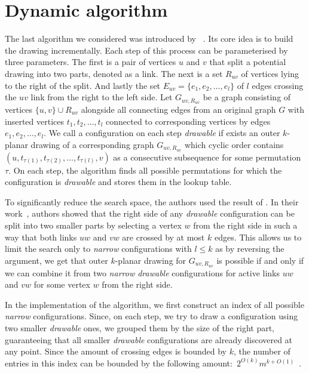 
\section{Dynamic algorithm}

The last algorithm we considered was introduced by \citeauthor{okp}~\cite{okp}. Its core idea is to build the drawing incrementally. Each step of this process can be parameterised by three parameters. The first is a pair of vertices \(u\) and \(v\) that split a potential drawing into two parts, denoted as a link. The next is a set \(R_{uv}\) of vertices lying to the right of the split. And lastly the set \(E_{uv} = \{e_1, e_2, \dots, e_l\}\) of \(l\) edges crossing the \(uv\) link from the right to the left side. Let \(G_{uv, R_{uv}}\) be a graph consisting of vertices \(\{u, v\} \cup R_{uv}\) alongside all connecting edges  from an original graph \(G\) with inserted vertices \(t_1, t_2, \dots, t_l\) connected to corresponding vertices by edges \(e_1, e_2, \dots, e_l\). We call a configuration on each step \emph{drawable} if exists an outer \(k\)-planar drawing of a corresponding graph \(G_{uv, R_{uv}}\) which cyclic order contains \((u, t_{\tau(1)}, t_{\tau(2)}, \dots, t_{\tau(l)}, v)\) as a consecutive subsequence for some permutation \(\tau\). On each step, the algorithm finds all possible permutations for which the configuration is \emph{drawable} and stores them in the lookup table.

To significantly reduce the search space, the authors used the result of \citeauthor{triangulations}. In their work~\cite{triangulations}, authors showed that the right side of any \emph{drawable} configuration can be split into two smaller parts by selecting a vertex \(w\) from the right side in such a way that both links \(uw\) and \(vw\) are crossed by at most \(k\) edges. This allows us to limit the search only to \emph{narrow} configurations with \(l \leqslant k\) as by reversing the argument, we get that outer \(k\)-planar drawing for \(G_{uv, R_{uv}}\) is possible if and only if we can combine it from two \emph{narrow drawable} configurations for active links \(uw\) and \(vw\) for some vertex \(w\) from the right side.

In the implementation of the algorithm, we first construct an index of all possible \emph{narrow} configurations. Since, on each step, we try to draw a configuration using two smaller \emph{drawable} ones, we grouped them by the size of the right part, guaranteeing that all smaller \emph{drawable} configurations are already discovered at any point. Since the amount of crossing edges is bounded by \(k\), the number of entries in this index can be bounded by the following amount:~\(2^{O(k)}m^{k+O(1)}\)~\cite[Lemma 15]{okp}.


